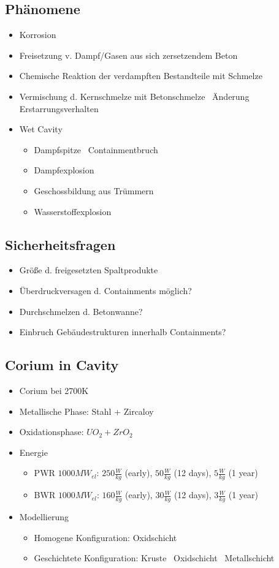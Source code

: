 \documentclass[12pt]{article}
\begin{document}
\subsection{Phänomene}
\begin{itemize}
	\item Korrosion
	\item Freisetzung v. Dampf/Gasen aus sich zersetzendem Beton
	\item Chemische Reaktion der verdampften Bestandteile mit Schmelze
	\item Vermischung d. Kernschmelze mit Betonschmelze \textrightarrow\ Änderung Erstarrungsverhalten
	\item Wet Cavity
		\begin{itemize}
			\item Dampfspitze \textrightarrow\ Containmentbruch
			\item Dampfexplosion
			\item Geschossbildung aus Trümmern
			\item Wasserstoffexplosion
		\end{itemize}
\end{itemize}

\subsection{Sicherheitsfragen}
\begin{itemize}
	\item Größe d. freigesetzten Spaltprodukte
	\item Überdruckversagen d. Containments möglich?
	\item Durchschmelzen d. Betonwanne?
	\item Einbruch Gebäudestrukturen innerhalb Containments?
\end{itemize}

\subsection{Corium in Cavity}
\begin{itemize}
	\item Corium bei 2700K
	\item Metallische Phase: Stahl + Zircaloy
	\item Oxidationsphase: \(UO_2 + ZrO_2\)
	\item Energie
		\begin{itemize}
			\item PWR \(1000MW_{el}\): \(250\frac{W}{kg}\) (early), \(50\frac{W}{kg}\) (12 days), \(5\frac{W}{kg}\) (1 year)
			\item BWR \(1000MW_{el}\): \(160\frac{W}{kg}\) (early), \(30\frac{W}{kg}\) (12 days), \(3\frac{W}{kg}\) (1 year)
		\end{itemize}
	\item Modellierung
		\begin{itemize}
			\item Homogene Konfiguration: Oxidschicht
			\item Geschichtete Konfiguration: Kruste \textrightarrow\ Oxidschicht \textrightarrow\ Metallschicht
		\end{itemize}
\end{itemize}
\end{document}
